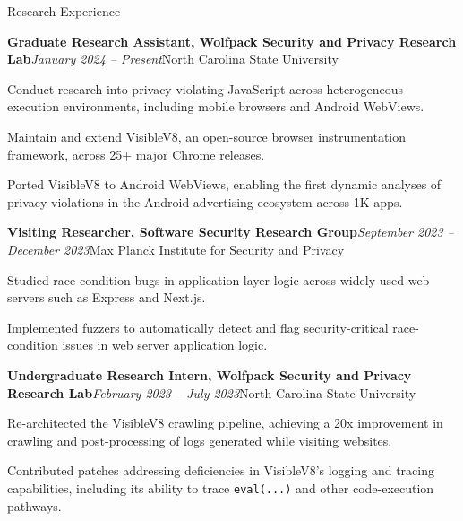 \documentclass{resume} %
\begin{document}
\begin{rSection}{Research Experience}
\begin{rSubsection}{\bf Graduate Research Assistant, Wolfpack Security and Privacy Research Lab}{\em January 2024 -- Present}{North Carolina State University}{}
\item Conduct research into privacy-violating JavaScript across heterogeneous execution environments, including mobile browsers and Android WebViews.
\item Maintain and extend VisibleV8, an open-source browser instrumentation framework, across 25+ major Chrome releases.
\item Ported VisibleV8 to Android WebViews, enabling the first dynamic analyses of privacy violations in the Android advertising ecosystem across 1K apps.
\end{rSubsection}
\begin{rSubsection}{\bf Visiting Researcher, Software Security Research Group}{\em September 2023 -- December 2023}{Max Planck Institute for Security and Privacy}{}
\item Studied race-condition bugs in application-layer logic across widely used web servers such as Express and Next.js.
\item Implemented fuzzers to automatically detect and flag security-critical race-condition issues in web server application logic.
\end{rSubsection}
\begin{rSubsection}{\bf Undergraduate Research Intern, Wolfpack Security and Privacy Research Lab}{\em February 2023 -- July 2023}{North Carolina State University}{}
\item Re-architected the VisibleV8 crawling pipeline, achieving a 20x improvement in crawling and post-processing of logs generated while visiting websites.
\item Contributed patches addressing deficiencies in VisibleV8's logging and tracing capabilities, including its ability to trace \texttt{eval(...)} and other code-execution pathways.

\end{rSubsection}
\end{rSection}
\end{document}
